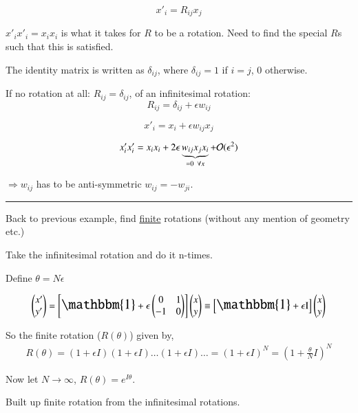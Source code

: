 {\begin{equation*}
x'_i = R_{ij}x_j
\end{equation*}

$x'_i x'_i = x_i x_i$ is what it takes for $R$ to be a rotation. 
Need to find the special $R$s such that this is satisfied.

The identity matrix is written as $\delta_{ij}$, where $\delta_{ij} = 1$ if $i=j$, 0 otherwise.

If no rotation at all: $R_{ij} = \delta_{ij}$,  of an infinitesimal rotation:  
\begin{equation*}
R_{ij} = \delta_{ij} + \epsilon w_{ij}
\end{equation*}

\begin{equation*}
x'_{i} = x_i + \epsilon w_{ij} x_j
\end{equation*}


\begin{equation*}
x'_{i}x'_{i} = x_i x_{i} + 2 \epsilon \underbrace{w_{ij} x_j x_i}_{ =0 \hspace*{0.05in} \forall x }  + \mathcal{O}(\epsilon^2)
\end{equation*}

$\Rightarrow w_{ij}$ has to be anti-symmetric $w_{ij} = - w_{ji}$.

\noindent\rule{\textwidth}{1pt}

Back to previous example, find \underline{finite} rotations (without any mention of geometry etc.)

Take the infinitesimal rotation and do it n-times.

Define $\theta = N\epsilon$

\begin{eqnarray*}
\xyprime = \left[ \mathlarger{\mathlarger{\mathbbm{1}}} + \epsilon   \IMatrix \right]\xy \equiv \left[ \mathlarger{\mathlarger{\mathbbm{1}}} + \epsilon   \textrm{I} \right]\xy
\end{eqnarray*}

So the finite rotation ($R(\theta)$) given by,
\begin{eqnarray*}
R(\theta) = (1 + \epsilon I)(1 + \epsilon I) \dots (1 + \epsilon I) \dots = (1+\epsilon I)^N = \left(1+\frac{\theta}{N}I\right)^N
\end{eqnarray*}

Now let $N\rightarrow \infty$,  $R(\theta) = e^{I\theta}$.

Built up finite rotation from the infinitesimal rotations.
 
}
